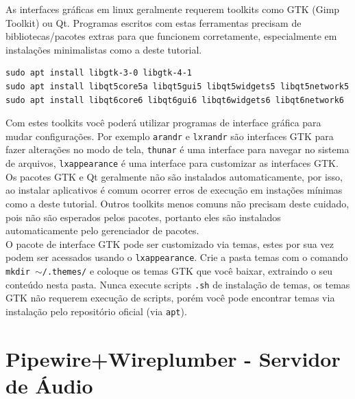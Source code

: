 \documentclass[12pt,a4paper]{article}
\begin{document}
\vspace{\baselineskip}

As interfaces gráficas em linux geralmente requerem toolkits como GTK (Gimp Toolkit) ou Qt. Programas escritos com estas ferramentas precisam de bibliotecas/pacotes extras para que funcionem corretamente, especialmente em instalações minimalistas como a deste tutorial. \\

\begin{lstlisting}
sudo apt install libgtk-3-0 libgtk-4-1
sudo apt install libqt5core5a libqt5gui5 libqt5widgets5 libqt5network5
sudo apt install libqt6core6 libqt6gui6 libqt6widgets6 libqt6network6
\end{lstlisting}

\vspace{\baselineskip}

Com estes toolkits você poderá utilizar programas de interface gráfica para mudar configurações. Por exemplo \texttt{arandr} e \texttt{lxrandr} são interfaces GTK para fazer alterações no modo de tela, \texttt{thunar} é uma interface para navegar no sistema de arquivos, \texttt{lxappearance} é uma interface para customizar as interfaces GTK.\\

Os pacotes GTK e Qt geralmente não são instalados automaticamente, por isso, ao instalar aplicativos é comum ocorrer erros de execução em instações mínimas como a deste tutorial. Outros toolkits menos comuns não precisam deste cuidado, pois não são esperados pelos pacotes, portanto eles são instalados automaticamente pelo gerenciador de pacotes. \\

O pacote de interface GTK pode ser customizado via temas, estes por sua vez podem ser acessados usando o \texttt{lxappearance}. Crie a pasta temas com o comando \texttt{mkdir $\sim$/.themes/} e coloque os temas GTK que você baixar, extraindo o seu conteúdo nesta pasta. Nunca execute scripts \texttt{.sh} de instalação de temas, os temas GTK não requerem execução de scripts, porém você pode encontrar temas via instalação pelo repositório oficial (via \texttt{apt}). 

\section{Pipewire+Wireplumber - Servidor de Áudio}
\end{document}
